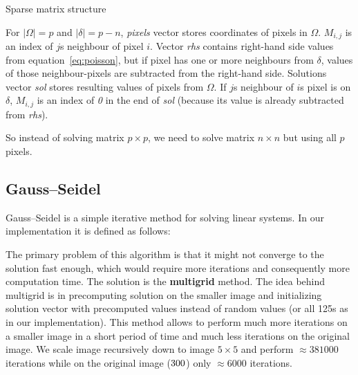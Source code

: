 \documentclass[hidelinks, english]{report}
\begin{document}
\begin{table*}[t]
    \caption{Sparse matrix structure}
    \label{tbl:sparse}
\end{table*}

For $ |\Omega| = p $ and $ |\delta| = p-n $, \textit{pixels} vector stores coordinates of pixels in $\Omega$. $M_{i,j}$
is an index of $j$s neighbour of pixel $i$. Vector \textit{rhs} contains right-hand side values from
equation~\eqref{eq:poisson}, but if pixel has one or more neighbours from $\delta$, values of those neighbour-pixels are
subtracted from the right-hand side. Solutions vector \textit{sol} stores resulting values of pixels from $\Omega$. If
$j$s neighbour of $i$s pixel is on $\delta$, $M_{i,j}$ is an index of \textit{0} in the end of \textit{sol} (because its
value is already subtracted from \textit{rhs}).

So instead of solving matrix $p \times p$, we need to solve matrix $n \times n$ but using all $p$ pixels.

\subsection{Gauss–Seidel}
Gauss–Seidel is a simple iterative method for solving linear systems. In our implementation it is defined as
follows:


The primary problem of this algorithm is that it might not converge to the solution fast enough, which would require
more iterations and consequently more computation time. The solution is the \textbf{multigrid} method. The idea behind
multigrid is in precomputing solution on the smaller image and initializing solution vector with precomputed values
instead of random values (or all 125s as in our implementation). This method allows to perform much more iterations on
a smaller image in a short period of time and much less iterations on the original image. We scale image recursively
down to image $5 \times 5$ and perform $\approx 381000$ iterations while on the original image ($300 \time 300$) only
$\approx 6000$ iterations.


\end{document}
